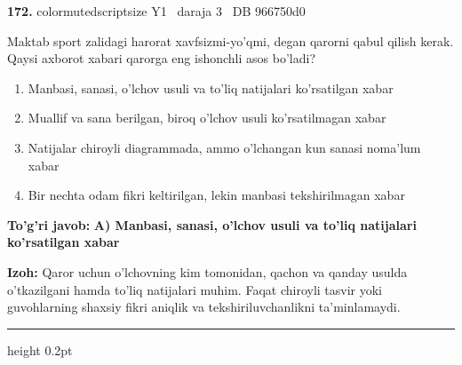 \documentclass[10pt,a4paper,oneside]{article}
\begin{document}
\noindent\textbf{\color{ink}172.}  {color{muted}scriptsize Y1 \textbullet\ daraja 3 \textbullet\ DB 966750d0}
\par
Maktab sport zalidagi harorat xavfsizmi-yo'qmi, degan qarorni qabul qilish kerak. Qaysi axborot xabari qarorga eng ishonchli asos bo'ladi?
\begin{enumerate}[label=\Alph*),leftmargin=9mm]
\item Manbasi, sanasi, o'lchov usuli va to'liq natijalari ko'rsatilgan xabar
\item Muallif va sana berilgan, biroq o'lchov usuli ko'rsatilmagan xabar
\item Natijalar chiroyli diagrammada, ammo o'lchangan kun sanasi noma'lum xabar
\item Bir nechta odam fikri keltirilgan, lekin manbasi tekshirilmagan xabar
\end{enumerate}
\begin{tcolorbox}[enhanced,breakable,colback=teal!4,colframe=teal!50!black,boxrule=0.5pt,arc=1.1mm,left=3mm,right=3mm,top=1.7mm,bottom=1.7mm,before skip=2mm,after skip=2mm]
\textbf{\color{teal}To'g'ri javob:} \textbf{A) Manbasi, sanasi, o'lchov usuli va to'liq natijalari ko'rsatilgan xabar}
\par\smallskip
\textbf{Izoh:} Qaror uchun o'lchovning kim tomonidan, qachon va qanday usulda o'tkazilgani hamda to'liq natijalari muhim. Faqat chiroyli tasvir yoki guvohlarning shaxsiy fikri aniqlik va tekshiriluvchanlikni ta'minlamaydi.
\end{tcolorbox}
\vspace{2mm}\hrule height 0.2pt \vspace{3mm}
\end{document}
